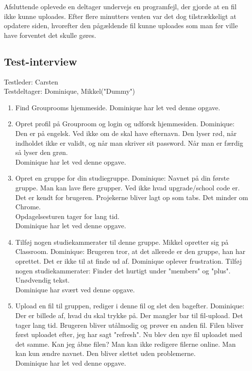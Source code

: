 \documentclass[12pt]{article}
\begin{document}
\noindent Afsluttende oplevede en deltager undervejs en programfejl, der gjorde at en fil ikke kunne uploades. Efter flere minutters venten var det dog tilstrækkeligt at opdatere siden, hvorefter den pågældende fil kunne uploades som man før ville have forventet det skulle gøres.

\subsection*{Test-interview}

Testleder: Carsten\\
Testdeltager: Dominique, Mikkel("Dummy")\\
\begin{enumerate}
  \item Find Grouprooms hjemmeside.
  Dominique har let ved denne opgave.

\item Opret profil på Grouproom og login og udforsk hjemmesiden.
Dominique: Den er på engelsk. Ved ikke om de skal have efternavn. Den lyser rød, når indholdet ikke er validt, og når man skriver sit password. Når man er færdig så lyser den grøn. \\
Dominique har let ved denne opgave.

\item Opret en gruppe for din studiegruppe.
Dominique: Navnet på din første gruppe. Man kan lave flere grupper. Ved ikke hvad upgrade/school code er.
Det er kendt for brugeren. Projekerne bliver lagt op som tabs. Det minder om Chrome. \\
Opdagelsesturen tager for lang tid.\\
Dominique har let ved denne opgave.

\item Tilføj nogen studiekammerater til denne gruppe.
Mikkel opretter sig på Classroom.
Dominique: Brugeren tror, at det allerede er den gruppe, han har oprettet.
Det er ikke til at finde ud af. Dominique oplever frustration.
Tilføj nogen studiekammerater: Finder det hurtigt under "members" og "plus". Unødvendig tekst.\\
Dominique har svært ved denne opgave. 

\item Upload en fil til gruppen, rediger i denne fil og slet den bagefter.
Dominique: Der er billede af, hvad du skal trykke på. Der mangler bar til fil-upload. Det tager lang tid. Brugeren bliver utålmodig og prøver en anden fil.
Filen bliver først uploadet efter, jeg har sagt "refresh".
Nu blev den nye fil uploadet med det samme.
Kan jeg åbne filen? Man kan ikke redigere filerne online. Man kan kun ændre navnet.
Den bliver slettet uden problemerne.\\
Dominique har let ved denne opgave.


\end{enumerate}
\end{document}
